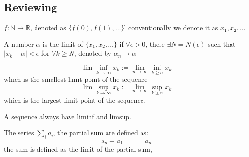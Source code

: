 \subsection{Reviewing}
\begin{definition}[Sequence]
$f:\mathbb{N}\to\mathbb{R}$, denoted as $\{f(0), f(1),\dots\}$l conventionally we denote it as $x_1,x_2,\dots$
\end{definition}
\begin{definition}
A number $\alpha$ is the limit of $\{x_1,x_2,\dots\}$ if $\forall\epsilon>0$, there $\exists N = N(\epsilon)$ such that $|x_k-\alpha|<\epsilon$ for $\forall k\ge N$, denoted by $\alpha_n\to\alpha$
\end{definition}
\begin{definition}
\[
\lim\inf_{k\to\infty}x_k :=\lim_{n\to\infty}\inf_{k\ge n}x_k
\]
which is the smallest limit point of the sequence
\[
\lim\sup_{k\to\infty}x_k :=\lim_{n\to\infty}\sup_{k\ge n}x_k
\]
which is the largest limit point of the sequence.
\end{definition}
A sequence always have liminf and limsup.
\begin{definition}
The series $\sum_ia_i$, the partial sum are defined as:
\[
s_n = a_1+\cdots+a_n
\]
the sum is defined as the limit of the partial sum,
\end{definition}













